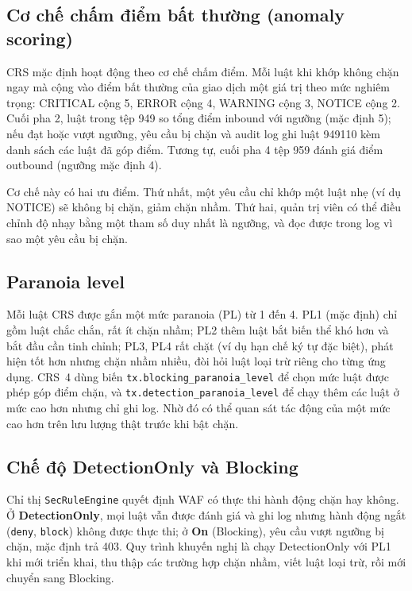 \subsection{Cơ chế chấm điểm bất thường (anomaly scoring)}
CRS mặc định hoạt động theo cơ chế chấm điểm. Mỗi luật khi khớp không chặn ngay mà cộng vào điểm bất thường của giao dịch một giá trị theo mức nghiêm trọng: CRITICAL cộng 5, ERROR cộng 4, WARNING cộng 3, NOTICE cộng 2. Cuối pha 2, luật trong tệp 949 so tổng điểm inbound với ngưỡng (mặc định 5); nếu đạt hoặc vượt ngưỡng, yêu cầu bị chặn và audit log ghi luật 949110 kèm danh sách các luật đã góp điểm. Tương tự, cuối pha 4 tệp 959 đánh giá điểm outbound (ngưỡng mặc định 4).


Cơ chế này có hai ưu điểm. Thứ nhất, một yêu cầu chỉ khớp một luật nhẹ (ví dụ NOTICE) sẽ không bị chặn, giảm chặn nhầm. Thứ hai, quản trị viên có thể điều chỉnh độ nhạy bằng một tham số duy nhất là ngưỡng, và đọc được trong log vì sao một yêu cầu bị chặn.

\subsection{Paranoia level}
Mỗi luật CRS được gắn một mức paranoia (PL) từ 1 đến 4. PL1 (mặc định) chỉ gồm luật chắc chắn, rất ít chặn nhầm; PL2 thêm luật bắt biến thể khó hơn và bắt đầu cần tinh chỉnh; PL3, PL4 rất chặt (ví dụ hạn chế ký tự đặc biệt), phát hiện tốt hơn nhưng chặn nhầm nhiều, đòi hỏi luật loại trừ riêng cho từng ứng dụng.
CRS~4 dùng biến \texttt{tx.blocking\_paranoia\_level} để chọn mức luật được phép góp điểm chặn, và \texttt{tx.detection\_paranoia\_level} để chạy thêm các luật ở mức cao hơn nhưng chỉ ghi log. Nhờ đó có thể quan sát tác động của một mức cao hơn trên lưu lượng thật trước khi bật chặn.

\subsection{Chế độ DetectionOnly và Blocking}
Chỉ thị \texttt{SecRuleEngine} quyết định WAF có thực thi hành động chặn hay không. Ở \textbf{DetectionOnly}, mọi luật vẫn được đánh giá và ghi log nhưng hành động ngắt (\texttt{deny}, \texttt{block}) không được thực thi; ở \textbf{On} (Blocking), yêu cầu vượt ngưỡng bị chặn, mặc định trả 403. Quy trình khuyến nghị là chạy DetectionOnly với PL1 khi mới triển khai, thu thập các trường hợp chặn nhầm, viết luật loại trừ, rồi mới chuyển sang Blocking.
